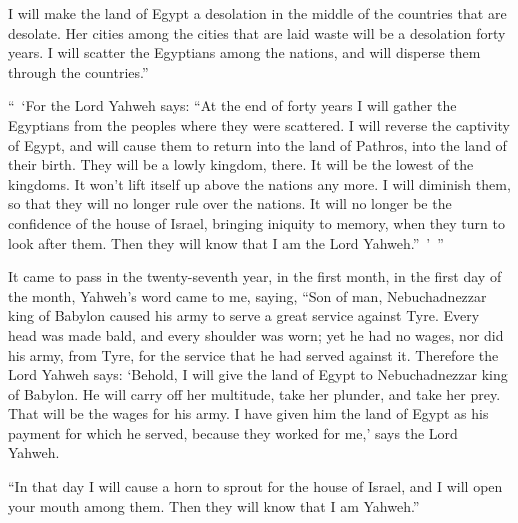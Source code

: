 {I will make the land of Egypt a desolation in the middle of the countries that are desolate. Her cities among the cities that are laid waste will be a desolation forty years. I will scatter the Egyptians among the nations, and will disperse them through the countries.”
\par }{\PP {}“ ‘For the Lord Yahweh says: “At the end of forty years I will gather the Egyptians from the peoples where they were scattered.
I will reverse the captivity of Egypt, and will cause them to return into the land of Pathros, into the land of their birth. They will be a lowly kingdom, there.
It will be the lowest of the kingdoms. It won’t lift itself up above the nations any more. I will diminish them, so that they will no longer rule over the nations.
It will no longer be the confidence of the house of Israel, bringing iniquity to memory, when they turn to look after them. Then they will know that I am the Lord Yahweh.” ’ ”
\par }{\BB \par }{\PP {}It came to pass in the twenty-seventh year, in the first month, in the first day of the month, Yahweh’s word came to me, saying,
“Son of man, Nebuchadnezzar king of Babylon caused his army to serve a great service against Tyre. Every head was made bald, and every shoulder was worn; yet he had no wages, nor did his army, from Tyre, for the service that he had served against it.
Therefore the Lord Yahweh says: ‘Behold, I will give the land of Egypt to Nebuchadnezzar king of Babylon. He will carry off her multitude, take her plunder, and take her prey. That will be the wages for his army.
I have given him the land of Egypt as his payment for which he served, because they worked for me,’ says the Lord Yahweh.
\par }{\PP {}“In that day I will cause a horn to sprout for the house of Israel, and I will open your mouth among them. Then they will know that I am Yahweh.”

}
